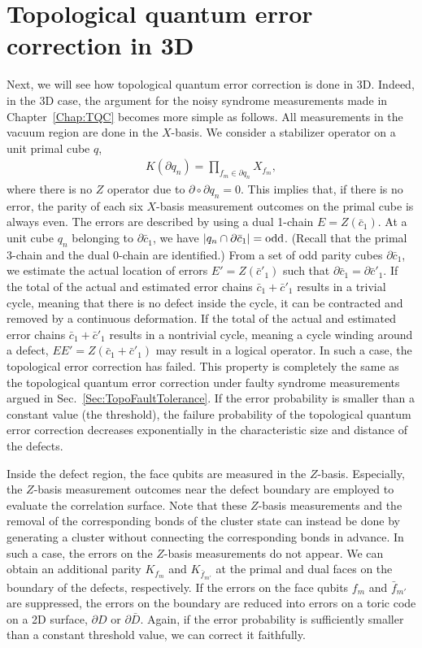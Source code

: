 \section{Topological quantum error correction in 3D}
Next, we will see how topological quantum error correction is
done in 3D.
Indeed, in the 3D case, 
the argument for the noisy syndrome measurements 
made in Chapter~\ref{Chap:TQC}
becomes more simple as follows.
All measurements in the vacuum region are done in the $X$-basis.
We consider a stabilizer operator on a unit primal cube $q$,
\begin{eqnarray}
K(\partial q_n) = \prod _{f_m \in \partial q_n } X_{f_m},
\end{eqnarray}
where there is no $Z$ operator due to $\partial \circ \partial q_n =0$.
This implies that, if there is no error, the parity of each six $X$-basis measurement outcomes on the primal cube is always even.
The errors are described by using a dual 1-chain $E=Z(\bar c_1)$.
At a unit cube $q_n$ belonging to $\partial \bar c_1$, 
we have 
$|q_n \cap \partial \bar c_1 |={\rm odd}$.
(Recall that the primal $3$-chain and the dual $0$-chain are identified.)
From a set of odd parity cubes $\partial \bar c_1$, we estimate the actual location of errors $E' = Z(\bar c'_1)$ such that $\partial \bar c_1 = \partial \bar c'_1$.
If the total of the actual and estimated error chains $\bar c_1 + \bar c'_1$ results in a trivial cycle, meaning that there is no defect inside the cycle, it can be contracted and removed by a continuous deformation.
If the total of the actual and estimated error chains $\bar c_1 + \bar c'_1$ results in a nontrivial cycle, meaning a cycle winding around a defect, $EE'=Z(\bar c_1 + \bar c'_1)$ may result in a logical operator. 
In such a case, the topological error correction has failed.
This property is completely the same as the topological quantum error correction
under faulty syndrome measurements 
argued in Sec.~\ref{Sec:TopoFaultTolerance}.
If the error probability is smaller than a constant value (the threshold), the failure probability of the topological quantum error correction decreases exponentially in the characteristic size and distance of the defects.

Inside the defect region, the face qubits are measured in the $Z$-basis.
Especially, the $Z$-basis measurement outcomes near the defect boundary are employed to evaluate the correlation surface.
Note that these $Z$-basis measurements and the removal of the corresponding bonds of the cluster state can instead be done by generating a cluster without connecting the corresponding bonds in advance.
In such a case, the errors on the $Z$-basis measurements do not appear.
We can obtain an additional parity $K_{f_m}$ and $K_{\bar f_{m'}}$ at the primal and dual faces on the boundary of the defects, respectively.
If the errors on the face qubits ${f_m}$ and $\bar f_{m'}$ are suppressed, the errors on the boundary are reduced into errors on a toric code on a 2D surface, $\partial D$ or 
$\partial \bar D$.
Again, if the error probability is sufficiently smaller than a constant threshold value, we can correct it faithfully.

